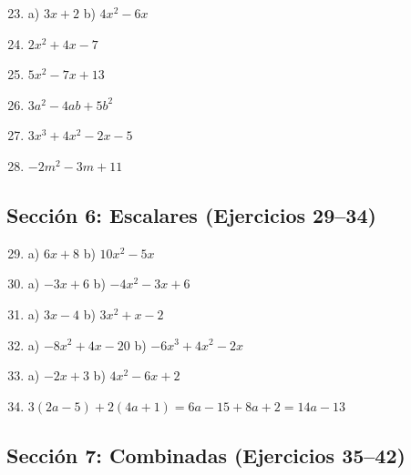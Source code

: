 \documentclass[12pt, letterpaper]{article}
\begin{document}
  \begin{enumerate}[leftmargin=*, label=\textbf{\arabic*.}]
    \setcounter{enumi}{22}
    \item a) $3x + 2$ \quad b) $4x^2 - 6x$

    \item $2x^2 + 4x - 7$

    \item $5x^2 - 7x + 13$

    \item $3a^2 - 4ab + 5b^2$

    \item $3x^3 + 4x^2 - 2x - 5$

    \item $-2m^2 - 3m + 11$
  \end{enumerate}

  \newpage

  \subsection*{Sección 6: Escalares (Ejercicios 29--34)}

  \begin{enumerate}[leftmargin=*, label=\textbf{\arabic*.}]
    \setcounter{enumi}{28}
    \item a) $6x + 8$ \quad b) $10x^2 - 5x$

    \item a) $-3x + 6$ \quad b) $-4x^2 - 3x + 6$

    \item a) $3x - 4$ \quad b) $3x^2 + x - 2$

    \item a) $-8x^2 + 4x - 20$ \quad b) $-6x^3 + 4x^2 - 2x$

    \item a) $-2x + 3$ \quad b) $4x^2 - 6x + 2$

    \item $3(2a - 5) + 2(4a + 1) = 6a - 15 + 8a + 2 = 14a - 13$
  \end{enumerate}

  \newpage

  \subsection*{Sección 7: Combinadas (Ejercicios 35--42)}
\end{document}

